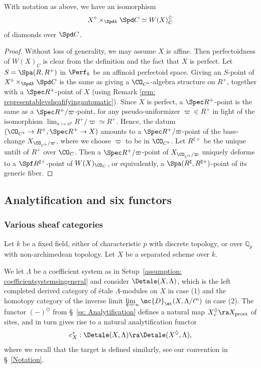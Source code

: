\documentclass[letterpaper,11pt]{amsart}
\begin{document}
\begin{lemma}\label{lemma: PerfectDeformation}
With notation as above, we have an isomorphism
\[ X^\diamond \times_{\Spd k} \Spd C \simeq W(X)_{{C}}^{\Diamond} \] 
of diamonds over $\Spd C$.
\end{lemma}
\begin{proof}
Without loss of generality, we may assume $X$ is affine. Then perfectoidness of $W(X)_{C}$ is clear from the definition and the fact that $X$ is perfect. Let $S=\Spa(R,R^+)$ in $\Perf_k$ be an affinoid perfectoid space. Giving an $S$-point of $X^\diamond \times_{\Spd k}\Spd C$ is the same as giving a $\CO_{C^\flat}$-algebra structure on $R^+$, together with a $\Spec R^+$-point of $X$ (using Remark \ref{rem: representablevsheafifyingautomatic}). Since $X$ is perfect, a $\Spec R^+$-point is the same as a  $\Spec R^+/\varpi$-point, for any pseudo-uniformizer $\varpi\in R^+$ in light of the isomorphism $\lim_{x \mapsto x^{p}} R^{+}/\varpi \simeq R^{+}$. Hence, the datum $(\CO_{C^\flat}\to R^+, \Spec R^+\to X)$ amounts to a $\Spec R^+/\varpi$-point of the base-change $X_{\CO_{C^\flat}/\varpi}$, where we choose $\varpi$ to be in $\CO_{C^\flat}$. Let $R^{\sharp+}$ be the unique untilt of $R^+$ over $\CO_C$. Then a $\Spec R^+/\varpi$-point of $X_{\CO_{C^\flat}/\varpi}$ uniquely deforms to a $\Spf R^{\sharp +}$-point of $W(X)_{\CO_C}$, or equivalently, a $\Spa (R^\sharp, R^{\sharp+})$-point of its generic fiber.
\end{proof}

\subsection{Analytification and six functors}\label{sec: analytification} 

\subsubsection{Various sheaf categories}
\label{ss: VariousSheafCategories}
Let $k$ be a fixed field, either of characteristic $p$ with discrete topology, or over $\mathbb{Q}_{p}$ with non-archimedean topology. Let $X$ be a separated scheme over $k$.


We let $\Lambda$ be a coefficient system as in Setup~\ref{assumption: coefficientsystemsingeneral} and consider $\Detale(X,\Lambda)$, which is the left completed derived category of \'etale $\Lambda$-modules on $X$ in case (1) and the homotopy category of the inverse limit $\varprojlim_n\mc{D}_{\et}(X,\Lambda/\ell^n)$ in case (2). The functor $(-)^{\Diamond}$ from \S~\ref{ss: Analytification} defines a natural map $X_{v}^{\Diamond} \ra X_{\text{proet}}$ of sites, and in turn gives rise to a natural analytification functor 
    \[ c_{X}^\ast: \Detale(X,\Lambda) \ra \Detale(X^{\Diamond},\Lambda), \]
where we recall that the target is defined similarly, see our convention in \S~\ref{Notation}. 
\end{document}
